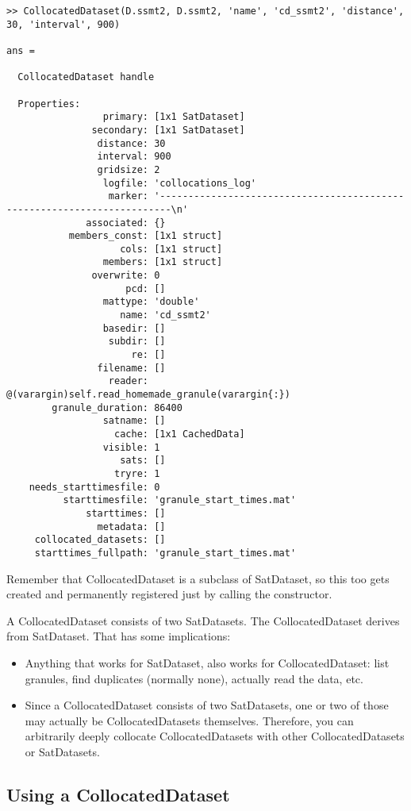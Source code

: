 \documentclass[a4paper,10pt]{article}
\begin{document}
\begin{lstlisting}
>> CollocatedDataset(D.ssmt2, D.ssmt2, 'name', 'cd_ssmt2', 'distance', 30, 'interval', 900)

ans = 

  CollocatedDataset handle

  Properties:
                 primary: [1x1 SatDataset]
               secondary: [1x1 SatDataset]
                distance: 30
                interval: 900
                gridsize: 2
                 logfile: 'collocations_log'
                  marker: '------------------------------------------------------------------------\n'
              associated: {}
           members_const: [1x1 struct]
                    cols: [1x1 struct]
                 members: [1x1 struct]
               overwrite: 0
                     pcd: []
                 mattype: 'double'
                    name: 'cd_ssmt2'
                 basedir: []
                  subdir: []
                      re: []
                filename: []
                  reader: @(varargin)self.read_homemade_granule(varargin{:})
        granule_duration: 86400
                 satname: []
                   cache: [1x1 CachedData]
                 visible: 1
                    sats: []
                   tryre: 1
    needs_starttimesfile: 0
          starttimesfile: 'granule_start_times.mat'
              starttimes: []
                metadata: []
     collocated_datasets: []
     starttimes_fullpath: 'granule_start_times.mat'
\end{lstlisting}

Remember that CollocatedDataset is a subclass of SatDataset, so this too
gets created and permanently registered just by calling the constructor.

A CollocatedDataset consists of two SatDatasets.
The CollocatedDataset derives from SatDataset.
That has some implications:
\begin{itemize}
\item Anything that works for SatDataset, also works for CollocatedDataset:
list granules, find duplicates (normally none), actually read the data, etc.
\item Since a CollocatedDataset consists of two SatDatasets, one or two of
those may actually be CollocatedDatasets themselves.
Therefore, you can arbitrarily deeply collocate CollocatedDatasets with
other CollocatedDatasets or SatDatasets.
\end{itemize}

\subsection{Using a CollocatedDataset}
\end{document}
